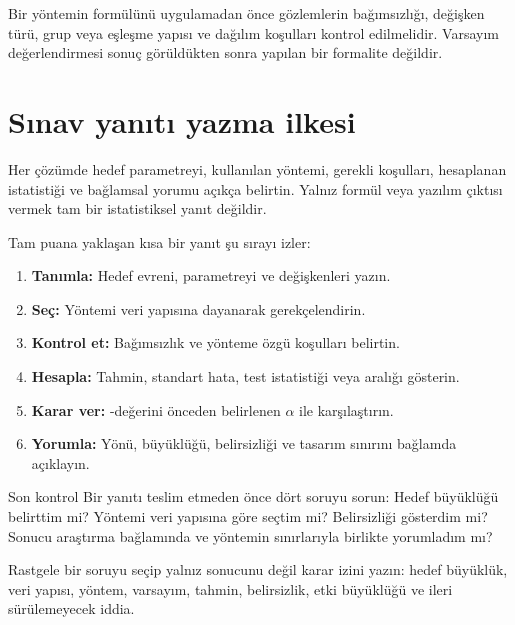 \begin{assumptionbox}
Bir yöntemin formülünü uygulamadan önce gözlemlerin bağımsızlığı, değişken
türü, grup veya eşleşme yapısı ve dağılım koşulları kontrol edilmelidir.
Varsayım değerlendirmesi sonuç görüldükten sonra yapılan bir formalite değildir.
\end{assumptionbox}

\section{Sınav yanıtı yazma ilkesi}

Her çözümde hedef parametreyi, kullanılan yöntemi, gerekli koşulları,
hesaplanan istatistiği ve bağlamsal yorumu açıkça belirtin. Yalnız formül veya
yazılım çıktısı vermek tam bir istatistiksel yanıt değildir.

Tam puana yaklaşan kısa bir yanıt şu sırayı izler:

\begin{enumerate}
  \item \textbf{Tanımla:} Hedef evreni, parametreyi ve değişkenleri yazın.
  \item \textbf{Seç:} Yöntemi veri yapısına dayanarak gerekçelendirin.
  \item \textbf{Kontrol et:} Bağımsızlık ve yönteme özgü koşulları belirtin.
  \item \textbf{Hesapla:} Tahmin, standart hata, test istatistiği veya aralığı gösterin.
  \item \textbf{Karar ver:} \pval-değerini önceden belirlenen $\alpha$ ile karşılaştırın.
  \item \textbf{Yorumla:} Yönü, büyüklüğü, belirsizliği ve tasarım sınırını bağlamda açıklayın.
\end{enumerate}

\begin{prismbox}[PrismResearchGreen]{Son kontrol}
Bir yanıtı teslim etmeden önce dört soruyu sorun: Hedef büyüklüğü belirttim
mi? Yöntemi veri yapısına göre seçtim mi? Belirsizliği gösterdim mi? Sonucu
araştırma bağlamında ve yöntemin sınırlarıyla birlikte yorumladım mı?
\end{prismbox}





\begin{etkinlik}
Rastgele bir soruyu seçip yalnız sonucunu değil karar izini yazın: hedef
büyüklük, veri yapısı, yöntem, varsayım, tahmin, belirsizlik, etki büyüklüğü
ve ileri sürülemeyecek iddia.
\end{etkinlik}

